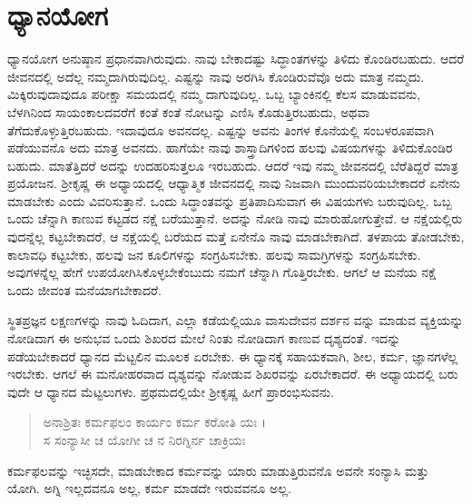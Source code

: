 
\chapter{ಧ್ಯಾನಯೋಗ}

ಧ್ಯಾನಯೋಗ ಅನುಷ್ಠಾನ ಪ್ರಧಾನವಾಗಿರುವುದು. ನಾವು ಬೇಕಾದಷ್ಟು ಸಿದ್ಧಾಂತಗಳನ್ನು ತಿಳಿದು ಕೊಂಡಿರಬಹುದು. ಆದರೆ ಜೀವನದಲ್ಲಿ ಅದೆಲ್ಲ ನಮ್ಮದಾಗಿರುವುದಿಲ್ಲ. ಎಷ್ಟನ್ನು ನಾವು ಅರಗಿಸಿ ಕೊಂಡಿರುವೆವೊ ಅದು ಮಾತ್ರ ನಮ್ಮದು. ಮಿಕ್ಕಿರುವುದಾವುದೂ ಪರೀಕ್ಷಾ ಸಮಯದಲ್ಲಿ ನಮ್ಮ ದಾಗುವುದಿಲ್ಲ. ಒಬ್ಬ ಬ್ಯಾಂಕಿನಲ್ಲಿ ಕೆಲಸ ಮಾಡುವವನು, ಬೆಳಗಿನಿಂದ ಸಾಯಂಕಾಲದವರೆಗೆ ಕಂತೆ ಕಂತೆ ನೋಟನ್ನು ಎಣಿಸಿ ಕೊಡುತ್ತಿರಬಹುದು, ಅಥವಾ ತೆಗೆದುಕೊಳ್ಳುತ್ತಿರಬಹುದು. ಇದಾವುದೂ ಅವನದಲ್ಲ. ಎಷ್ಟನ್ನು ಅವನು ತಿಂಗಳ ಕೊನೆಯಲ್ಲಿ ಸಂಬಳರೂಪವಾಗಿ ಪಡೆಯುವನೊ ಅದು ಮಾತ್ರ ಅವನದು. ಹಾಗೆಯೇ ನಾವು ಶಾಸ್ತ್ರಾದಿಗಳಿಂದ ಹಲವು ವಿಷಯಗಳನ್ನು ತಿಳಿದುಕೊಂಡಿರ ಬಹುದು. ಮಾತೆತ್ತಿದರೆ ಅದನ್ನು ಉದಹರಿಸುತ್ತಲೂ ಇರಬಹುದು. ಆದರೆ ಇವು ನಮ್ಮ ಜೀವನದಲ್ಲಿ ಬೆರೆತಿದ್ದರೆ ಮಾತ್ರ ಪ್ರಯೋಜನ. ಶ್ರೀಕೃಷ್ಣ ಈ ಅಧ್ಯಾಯದಲ್ಲಿ ಆಧ್ಯಾತ್ಮಿಕ ಜೀವನದಲ್ಲಿ ನಾವು ನಿಜವಾಗಿ ಮುಂದುವರಿಯಬೇಕಾದರೆ ಏನೇನು ಮಾಡಬೇಕು ಎಂದು ವಿವರಿಸುತ್ತಾನೆ. ಒಂದು ಸಿದ್ಧಾಂತವನ್ನು ಪ್ರತಿಪಾದಿಸುವಾಗ ಈ ವಿಷಯಗಳು ಬರುವುದಿಲ್ಲ. ಒಬ್ಬ ಒಂದು ಚೆನ್ನಾಗಿ ಕಾಣುವ ಕಟ್ಟಡದ ನಕ್ಷೆ ಬರೆಯುತ್ತಾನೆ. ಅದನ್ನು ನೋಡಿ ನಾವು ಮಾರುಹೋಗುತ್ತೇವೆ. ಆ ನಕ್ಷೆಯಲ್ಲಿರು ವುದನ್ನೆಲ್ಲ ಕಟ್ಟಬೇಕಾದರೆ, ಆ ನಕ್ಷೆಯಲ್ಲಿ ಬರೆಯದ ಮತ್ತೆ ಏನೇನೊ ನಾವು ಮಾಡಬೇಕಾಗಿದೆ. ತಳಪಾಯ ತೋಡಬೇಕು, ಕಾಲಾವಧಿ ಕಟ್ಟಬೇಕು, ಹಲವು ಜನ ಕೂಲಿಗಳನ್ನು ಸಂಗ್ರಹಿಸಬೇಕು. ಹಲವು ಸಾಮಗ್ರಿಗಳನ್ನು ಸಂಗ್ರಹಿಸಬೇಕು. ಅವುಗಳನ್ನೆಲ್ಲ ಹೇಗೆ ಉಪಯೋಗಿಸಿಕೊಳ್ಳಬೇಕೆಂಬುದು ನಮಗೆ ಚೆನ್ನಾಗಿ ಗೊತ್ತಿರಬೇಕು. ಆಗಲೆ ಆ ಮನೆಯ ನಕ್ಷೆ ಒಂದು ಜೀವಂತ ಮನೆಯಾಗಬೇಕಾದರೆ.

ಸ್ಥಿತಪ್ರಜ್ಞನ ಲಕ್ಷಣಗಳನ್ನು ನಾವು ಓದಿದಾಗ, ಎಲ್ಲಾ ಕಡೆಯಲ್ಲಿಯೂ ವಾಸುದೇವನ ದರ್ಶನ ವನ್ನು ಮಾಡುವ ವ್ಯಕ್ತಿಯನ್ನು ನೋಡಿದಾಗ ಈ ಅನುಭವ ಒಂದು ಶಿಖರದ ಮೇಲೆ ನಿಂತು ನೋಡಿದಾಗ ಕಾಣುವ ದೃಶ್ಯದಂತೆ. ಇದನ್ನು ಪಡೆಯಬೇಕಾದರೆ ಧ್ಯಾನದ ಮೆಟ್ಟಲಿನ ಮೂಲಕ ಏರಬೇಕು. ಈ ಧ್ಯಾನಕ್ಕೆ ಸಹಾಯಕವಾಗಿ, ಶೀಲ, ಕರ್ಮ, ಜ್ಞಾನಗಳೆಲ್ಲ ಇರಬೇಕು. ಆಗಲೆ ಈ ಮನೋಹರವಾದ ದೃಶ್ಯವನ್ನು ನೋಡುವ ಶಿಖರವನ್ನು ಏರಬೇಕಾದರೆ. ಈ ಅಧ್ಯಾಯದಲ್ಲಿ ಬರು ವುದೇ ಆ ಧ್ಯಾನದ ಮೆಟ್ಟಲುಗಳು. ಪ್ರಥಮದಲ್ಲಿಯೇ ಶ್ರೀಕೃಷ್ಣ ಹೀಗೆ ಪ್ರಾರಂಭಿಸುವನು.

\begin{verse}
ಅನಾಶ್ರಿತಃ ಕರ್ಮಫಲಂ ಕಾರ್ಯಂ ಕರ್ಮ ಕರೋತಿ ಯಃ ।\\ಸ ಸಂನ್ಯಾಸೀ ಚ ಯೋಗೀ ಚ ನ ನಿರಗ್ನಿರ್ನ ಚಾಕ್ರಿಯಃ 
\end{verse}

{\small ಕರ್ಮಫಲವನ್ನು ಇಚ್ಛಿಸದೇ, ಮಾಡಬೇಕಾದ ಕರ್ಮವನ್ನು ಯಾರು ಮಾಡುತ್ತಿರುವನೊ ಅವನೇ ಸಂನ್ಯಾಸಿ ಮತ್ತು ಯೋಗಿ. ಅಗ್ನಿ ಇಲ್ಲದವನೂ ಅಲ್ಲ, ಕರ್ಮ ಮಾಡದೇ ಇರುವವನೂ ಅಲ್ಲ.}

